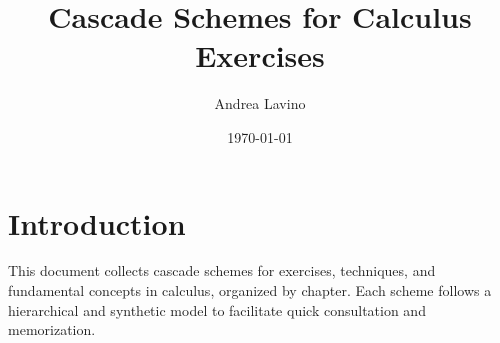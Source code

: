 \documentclass[11pt,a4paper]{article}
\title{Cascade Schemes for Calculus Exercises}
\author{Andrea Lavino}
\date{\today}
\begin{document}
\maketitle
\clearpage
\tableofcontents
\newpage

\section*{Introduction}
This document collects cascade schemes for exercises, techniques, and fundamental concepts in calculus, organized by chapter. Each scheme follows a hierarchical and synthetic model to facilitate quick consultation and memorization.






\end{document}
